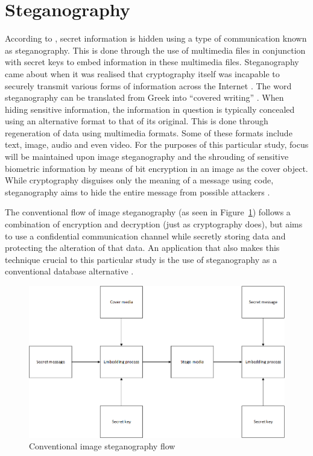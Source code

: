 \section[Steganography]{Steganography}
According to \cite{Kishor2016}, secret information is hidden using a type of communication known as steganography. This is done through the use of multimedia files in conjunction with secret keys to embed information in these multimedia files. Steganography came about when it was realised that cryptography itself was incapable to securely transmit various forms of information across the Internet \citep{Jain2016}. The word steganography can be translated from Greek into “covered writing” \citep{Pandit2016}. When hiding sensitive information, the information in question is typically concealed using an alternative format to that of its original. This is done through regeneration of data using multimedia formats. Some of these formats include text, image, audio and even video. For the purposes of this particular study, focus will be maintained upon image steganography and the shrouding of sensitive biometric information by means of bit encryption in an image as the cover object. While cryptography disguises only the meaning of a message using code, steganography aims to hide the entire message from possible attackers \citep{Kishor2016, Pradhan2016}.

The conventional flow of image steganography (as seen in Figure~\ref{fig:Conventional image steganography flow}) follows a combination of encryption and decryption (just as cryptography does), but aims to use a confidential communication channel while secretly storing data and protecting the alteration of that data. An application that also makes this technique crucial to this particular study is the use of steganography as a conventional database alternative \citep{Pandit2016}.


  
\begin{figure}[htbp!] 
\centering    
\includegraphics[width=1.0\textwidth]{Chapter2/Figs/Figure2-4.png}
\caption[Conventional image steganography flow]{Conventional image steganography flow}
\label{fig:Conventional image steganography flow}
\end{figure}

